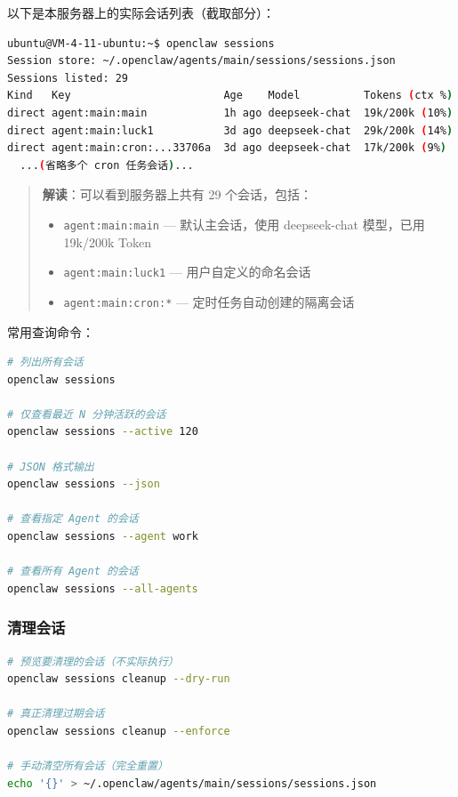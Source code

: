 以下是本服务器上的实际会话列表（截取部分）：

\begin{lstlisting}[language=bash]
ubuntu@VM-4-11-ubuntu:~$ openclaw sessions
Session store: ~/.openclaw/agents/main/sessions/sessions.json
Sessions listed: 29
Kind   Key                        Age    Model          Tokens (ctx %)
direct agent:main:main            1h ago deepseek-chat  19k/200k (10%)
direct agent:main:luck1           3d ago deepseek-chat  29k/200k (14%)
direct agent:main:cron:...33706a  3d ago deepseek-chat  17k/200k (9%)
  ...(省略多个 cron 任务会话)...
\end{lstlisting}

\begin{quote}
\textbf{解读}：可以看到服务器上共有 29 个会话，包括：
\begin{itemize}
  \item \texttt{agent:main:main} --- 默认主会话，使用 deepseek-chat 模型，已用 19k/200k Token
  \item \texttt{agent:main:luck1} --- 用户自定义的命名会话
  \item \texttt{agent:main:cron:*} --- 定时任务自动创建的隔离会话
\end{itemize}
\end{quote}

常用查询命令：

\begin{lstlisting}[language=bash]
# 列出所有会话
openclaw sessions

# 仅查看最近 N 分钟活跃的会话
openclaw sessions --active 120

# JSON 格式输出
openclaw sessions --json

# 查看指定 Agent 的会话
openclaw sessions --agent work

# 查看所有 Agent 的会话
openclaw sessions --all-agents
\end{lstlisting}

\subsubsection{清理会话}


\begin{lstlisting}[language=bash]
# 预览要清理的会话（不实际执行）
openclaw sessions cleanup --dry-run

# 真正清理过期会话
openclaw sessions cleanup --enforce

# 手动清空所有会话（完全重置）
echo '{}' > ~/.openclaw/agents/main/sessions/sessions.json
\end{lstlisting}

